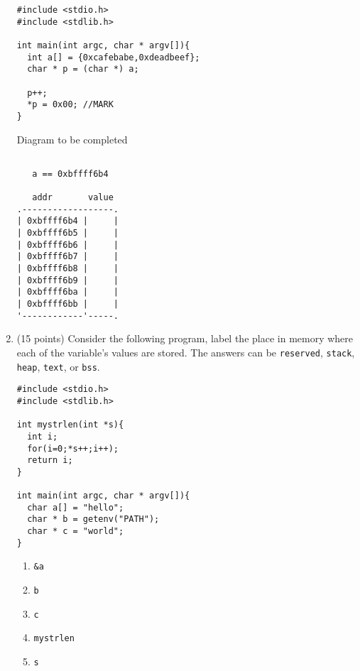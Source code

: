 \documentclass{article}[9pt]
\begin{document}
\begin{enumerate}
\begin{verbatim}
#include <stdio.h>
#include <stdlib.h>

int main(int argc, char * argv[]){
  int a[] = {0xcafebabe,0xdeadbeef};
  char * p = (char *) a;

  p++;
  *p = 0x00; //MARK
}

\end{verbatim}

Diagram to be completed
\begin{verbatim}

   a == 0xbffff6b4

   addr       value
.------------------.
| 0xbffff6b4 |     |
| 0xbffff6b5 |     |
| 0xbffff6b6 |     |
| 0xbffff6b7 |     |
| 0xbffff6b8 |     |
| 0xbffff6b9 |     |
| 0xbffff6ba |     |
| 0xbffff6bb |     |
'------------'-----. 
\end{verbatim}

\item (15 points) Consider the following program, label the place in memory where
each of the variable's values are stored. The answers can be
\texttt{reserved}, \texttt{stack}, \texttt{heap}, \texttt{text}, or \texttt{bss}.

\begin{verbatim}
#include <stdio.h>
#include <stdlib.h>

int mystrlen(int *s){
  int i;
  for(i=0;*s++;i++);
  return i;
}

int main(int argc, char * argv[]){
  char a[] = "hello";
  char * b = getenv("PATH");
  char * c = "world";
}

\end{verbatim}

\begin{enumerate}
\item \texttt{\&a}

\item \texttt{b}

\item \texttt{c}

\item \texttt{mystrlen}

\item \texttt{s}
\end{enumerate}
\end{enumerate}
\end{document}
